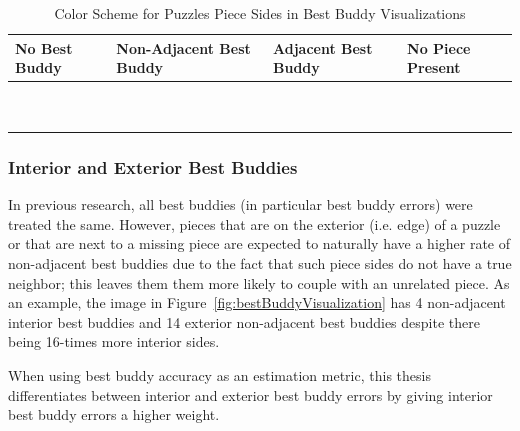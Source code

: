 \documentclass{report}
\begin{document}
\begin{table}
\begin{center}
  \begin{tabular}{ | >{\centering\arraybackslash}m{0.9in} | >{\centering\arraybackslash}m{0.9in} | >{\centering\arraybackslash}m{0.9in} | >{\centering\arraybackslash}m{0.9in} | }
  
   \hline
    No Best Buddy & Non-Adjacent Best Buddy & Adjacent Best Buddy & No Piece Present  \\ \hline
	{\cellcolor{white}~} & {\cellcolor{red}~} & {\cellcolor{green}~} & {\cellcolor{black}~}  \\
	{\cellcolor{white}~} & {\cellcolor{red}~} & {\cellcolor{green}~} & {\cellcolor{black}~}  \\
 \hline

  \end{tabular}
\end{center}
\caption{Color Scheme for Puzzles Piece Sides in Best Buddy Visualizations}\label{tab:bestBuddyColors}
\end{table}

\subsubsection{Interior and Exterior Best Buddies}\label{sec:interiorExteriorBestBuddies}

In previous research, all best buddies (in particular best buddy errors) were treated the same.  However, pieces that are on the exterior (i.e. edge) of a puzzle or that are next to a missing piece are expected to naturally have a higher rate of non-adjacent best buddies due to the fact that such piece sides do not have a true neighbor; this leaves them them more likely to couple with an unrelated piece.  As an example, the image in Figure~\ref{fig:bestBuddyVisualization} has 4 non-adjacent interior best buddies and 14 exterior non-adjacent best buddies despite there being 16-times more interior sides. 

When using best buddy accuracy as an estimation metric, this thesis differentiates between interior and exterior best buddy errors by giving interior best buddy errors a higher weight.






\end{document}
